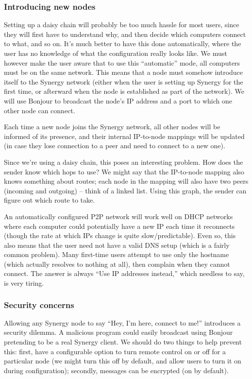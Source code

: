 \subsubsection{Introducing new nodes}

Setting up a daisy chain will probably be too much hassle for most users,
since they will first have to understand why, and then decide which computers
connect to what, and so on. It's much better to have this done automatically,
where the user has no knowledge of what the configuration really looks like.
We must however make the user aware that to use this ``automatic'' mode, all
computers must be on the same network. This means that a node must somehow
introduce itself to the Synergy network (either when the user is setting 
up Synergy for the first time, or afterward when the node is established
as part of the network). We will use Bonjour to broadcast the node's IP address
and a port to which one other node can connect.

Each time a new node joins the Synergy network, all other nodes will be informed
of its presence, and their internal IP-to-node mappings will be updated (in 
case they lose connection to a peer and need to connect to a new one).

Since we're using a daisy chain, this poses an interesting problem. How does
the sender know which hops to use? We might say that the IP-to-node mapping
also knows something about routes; each node in the mapping will also have two
peers (incoming and outgoing) -- think of a linked list. Using this graph,
the sender can figure out which route to take.

An automatically configured P2P network will work well on DHCP networks where
each computer could potentially have a new IP each time it reconnects (though
the rate at which IPs change is quite slow/predictable). Even so, this also 
means that the user need not have a valid DNS setup (which is a fairly common
problem). Many first-time users attempt to use only the hostname (which actually
resolves to nothing at all), then complain when they cannot connect. The answer
is always ``Use IP addresses instead,'' which needless to say, is very tiring.

\subsubsection{Security concerns}

Allowing any Synergy node to say ``Hey, I'm here, connect to me!'' introduces
a security dilemma. A malicious program could easily broadcast using Bonjour
pretending to be a real Synergy client. We should do two things to help prevent
this: first, have a configurable option to turn remote control on or off for
a particular node (we might turn this off by default, and allow users to turn
it on during configuration); secondly, messages can be encrypted (on by 
default).


